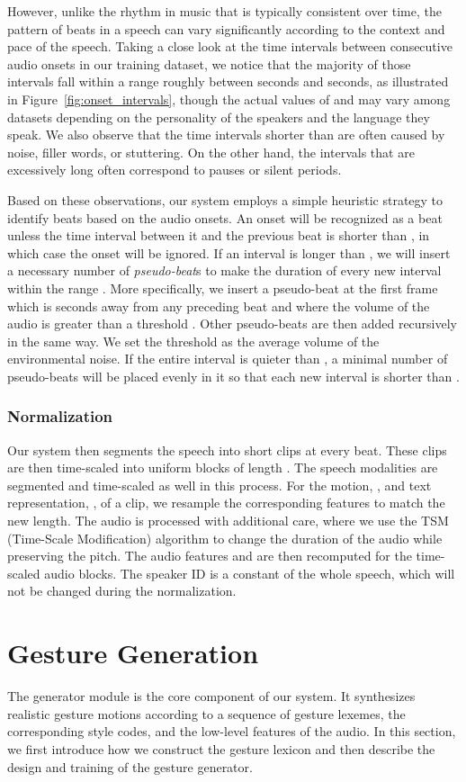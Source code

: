 \documentclass[acmtog,authorversion]{acmart}
\newcommand{\fig}{Figure{}~}
\begin{document}
However, unlike the rhythm in music that is typically consistent over time, the pattern of beats in a speech can vary significantly according to the context and pace of the speech. Taking a close look at the time intervals between consecutive audio onsets in our training dataset, we notice that the majority of those intervals fall within a range roughly between  seconds and  seconds, as illustrated in \fig\ref{fig:onset_intervals}, though the actual values of  and  may vary among datasets depending on the personality of the speakers and the language they speak. We also observe that the time intervals shorter than  are often caused by noise, filler words, or stuttering. On the other hand, the intervals that are excessively long often correspond to pauses or silent periods.

Based on these observations, our system employs a simple heuristic strategy to identify beats based on the audio onsets. An onset will be recognized as a beat unless the time interval between it and the previous beat is shorter than , in which case the onset will be ignored. If an interval is longer than , we will insert a necessary number of \emph{pseudo-beat}s to make the duration of every new interval within the range . More specifically, we insert a pseudo-beat at the first frame which is  seconds away from any preceding beat and where the volume of the audio is greater than a threshold . Other pseudo-beats are then added recursively in the same way. We set the threshold  as the average volume of the environmental noise. If the entire interval is quieter than , a minimal number of pseudo-beats will be placed evenly in it so that each new interval is shorter than .

\subsubsection{Normalization}
\label{subsubsec:normalization}
Our system then segments the speech into short clips at every beat. These clips are then time-scaled into uniform blocks of length . The speech modalities are segmented and time-scaled as well in this process. For the motion, , and text representation, , of a clip, we resample the corresponding features to match the new length. The audio is processed with additional care, where we use the TSM (Time-Scale Modification) algorithm to change the duration of the audio while preserving the pitch. The audio features  and  are then recomputed for the time-scaled audio blocks. The speaker ID  is a constant of the whole speech, which will not be changed during the normalization. \section{Gesture Generation}
\label{sec:gesture_generation}
The generator module is the core component of our system. It synthesizes realistic gesture motions according to a sequence of gesture lexemes, the corresponding style codes, and the low-level features of the audio. In this section, we first introduce how we construct the gesture lexicon and then describe the design and training of the gesture generator.
\end{document}
